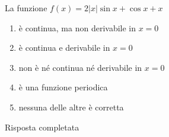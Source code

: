 \begin{quiz}
La funzione $f(x)=2|x|\sin x+\cos x+x$
\begin{enumerate}
\item \`e continua, ma non derivabile in $x=0$
\item \`e continua e derivabile in $x=0$
\item non \`e n\'e continua n\'e derivabile in $x=0$
\item \`e una funzione periodica
\item nessuna delle altre \`e corretta
\end{enumerate}
\end{quiz}
Risposta completata
